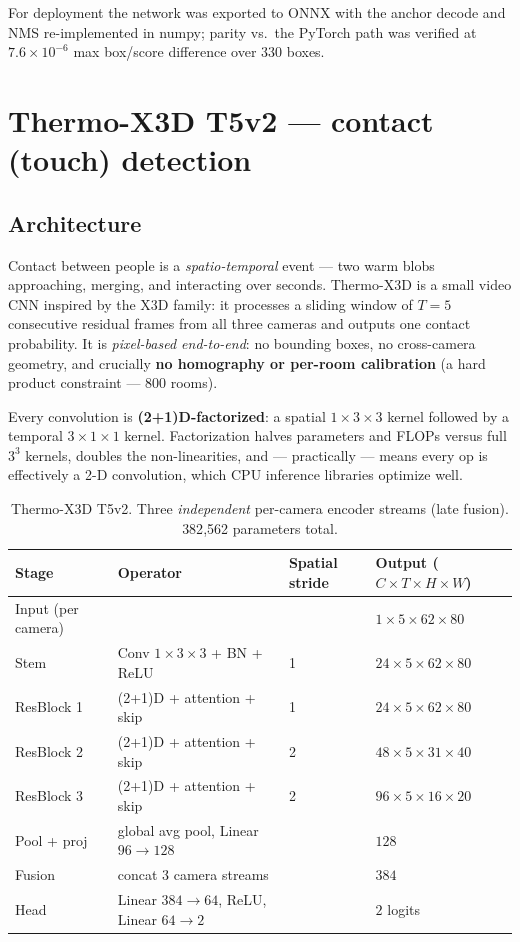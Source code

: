 \documentclass[11pt]{article}
\begin{document}
\noindent For deployment the network was exported to ONNX with the
anchor decode and NMS re-implemented in numpy; parity vs.\ the PyTorch path
was verified at $7.6\times10^{-6}$ max box/score difference over 330 boxes.

\section{Thermo-X3D T5v2 --- contact (touch) detection}

\subsection{Architecture}

Contact between people is a \emph{spatio-temporal} event --- two warm blobs
approaching, merging, and interacting over seconds. Thermo-X3D is a small
video CNN inspired by the X3D family: it processes a sliding window of
$T{=}5$ consecutive residual frames from all three cameras and outputs one
contact probability. It is \emph{pixel-based end-to-end}: no bounding
boxes, no cross-camera geometry, and crucially \textbf{no homography or
per-room calibration} (a hard product constraint --- 800 rooms).

Every convolution is \textbf{(2+1)D-factorized}: a spatial $1{\times}3{\times}3$
kernel followed by a temporal $3{\times}1{\times}1$ kernel. Factorization
halves parameters and FLOPs versus full $3^3$ kernels, doubles the
non-linearities, and --- practically --- means every op is effectively a 2-D
convolution, which CPU inference libraries optimize well.

\begin{table}[H]\centering\small
\begin{tabular}{llll}
\toprule
Stage & Operator & Spatial stride & Output ($C\times T\times H\times W$)\\
\midrule
Input (per camera) & & & $1\times5\times62\times80$\\
Stem & Conv $1{\times}3{\times}3$ + BN + ReLU & 1 & $24\times5\times62\times80$\\
ResBlock 1 & (2+1)D + attention + skip & 1 & $24\times5\times62\times80$\\
ResBlock 2 & (2+1)D + attention + skip & 2 & $48\times5\times31\times40$\\
ResBlock 3 & (2+1)D + attention + skip & 2 & $96\times5\times16\times20$\\
Pool + proj & global avg pool, Linear $96{\to}128$ & & $128$\\
\midrule
Fusion & concat 3 camera streams & & $384$\\
Head & Linear $384{\to}64$, ReLU, Linear $64{\to}2$ & & $2$ logits\\
\bottomrule
\end{tabular}
\caption{Thermo-X3D T5v2. Three \emph{independent} per-camera encoder
streams (late fusion). 382{,}562 parameters total.}
\end{table}
\end{document}

